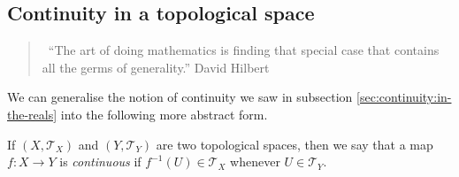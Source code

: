 \documentclass[a4paper,11pt]{article}
\begin{document}
\subsection{Continuity in a topological space\label{sec:continuity:in-a-topological-space}}

\begin{quote}
\quad\ ``The art of doing mathematics is finding that special case that contains all the germs of generality.''
\hfill David Hilbert
\end{quote}

We can generalise the notion of continuity we saw in subsection \ref{sec:continuity:in-the-reals} into the following more abstract form.

If $(X, \mathcal{T}_X)$ and $(Y, \mathcal{T}_Y)$ are two topological spaces, then we say that a map $f : X \to Y$ is \textit{continuous} if $f^{-1}(U) \in \mathcal{T}_X$ whenever $U \in \mathcal{T}_Y$.
\end{document}
